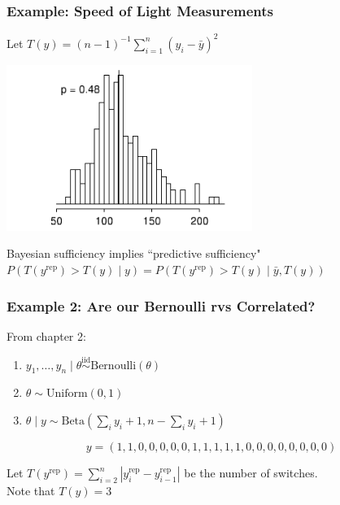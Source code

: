 \documentclass{beamer}
\begin{document}
\begin{frame}
\frametitle{Example: Speed of Light Measurements}

Let $T(y) = (n-1)^{-1}\sum_{i=1}^n (y_i-\bar{y})^2$

\begin{center}
\includegraphics[width=80mm]{s2_hist.png}
\end{center}

Bayesian sufficiency implies ``predictive sufficiency" \\
$P(T(y^{\text{rep} } ) > T(y ) \mid y) = P(T(y^{\text{rep} } ) > T(y) \mid \bar{y}, T(y))$


\end{frame}

\begin{frame}
\frametitle{Example 2: Are our Bernoulli rvs Correlated?}

From chapter 2:
\begin{enumerate}
\item $y_1, \ldots, y_n \mid \theta \overset{\text{iid}}{\sim} \text{Bernoulli}(\theta)$
\item $\theta \sim \text{Uniform}(0,1)$
\item $\theta \mid y \sim \text{Beta}(\sum_i y_i + 1, n - \sum_i y_i + 1)$
\end{enumerate}
\pause


\[
y = (1,1,0,0,0,0,0,1,1,1,1,1,0,0,0,0,0,0,0,0)
\]
\pause

Let $T(y^{\text{rep}}) =  \sum_{i=2}^n |y^{\text{rep}}_i - y^{\text{rep}}_{i-1}|$ be the number of switches. \\
Note that $T(y) = 3$
\end{frame}
\end{document}
